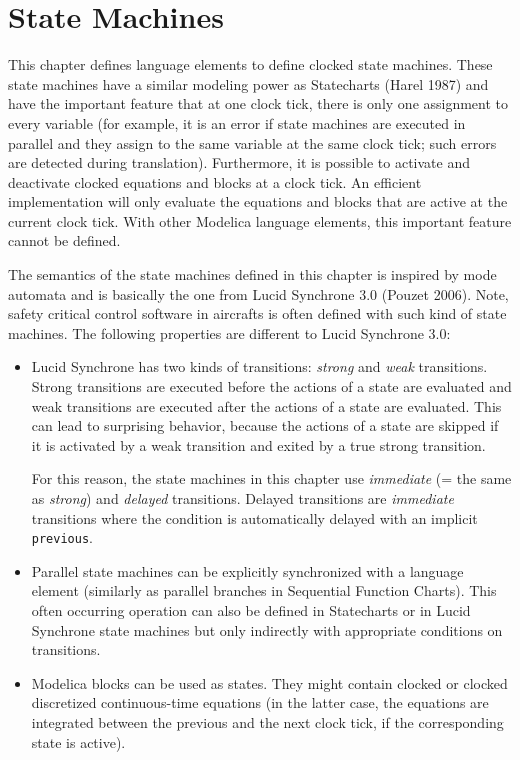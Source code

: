 \chapter{State Machines}\label{state-machines}

This chapter defines language elements to define clocked state
machines. These state machines have a similar modeling power as
Statecharts (Harel 1987) and have the important feature that at one
clock tick, there is only one assignment to every variable (for example,
it is an error if state machines are executed in parallel and they
assign to the same variable at the same clock tick; such errors are
detected during translation). Furthermore, it is possible to activate
and deactivate clocked equations and blocks at a clock tick. An
efficient implementation will only evaluate the equations and blocks
that are active at the current clock tick. With other Modelica language
elements, this important feature cannot be defined.

The semantics of the state machines defined in this chapter is
inspired by mode automata and is basically the one from Lucid Synchrone
3.0 (Pouzet 2006). Note, safety critical control software in aircrafts
is often defined with such kind of state machines. The following
properties are different to Lucid Synchrone 3.0:
\begin{itemize}
\item
  Lucid Synchrone has two kinds of transitions: \emph{strong} and
  \emph{weak} transitions. Strong transitions are executed before the
  actions of a state are evaluated and weak transitions are executed
  after the actions of a state are evaluated. This can lead to
  surprising behavior, because the actions of a state are skipped if it
  is activated by a weak transition and exited by a true strong
  transition.

  For this reason, the state machines in this chapter use \emph{immediate}
  (= the same as \emph{strong}) and \emph{delayed} transitions. Delayed
  transitions are \emph{immediate} transitions where the condition is
  automatically delayed with an implicit \lstinline!previous!.
\item
  Parallel state machines can be explicitly synchronized with a
  language element (similarly as parallel branches in Sequential
  Function Charts). This often occurring operation can also be defined
  in Statecharts or in Lucid Synchrone state machines but only
  indirectly with appropriate conditions on transitions.
\item
  Modelica blocks can be used as states. They might contain
  clocked or clocked discretized continuous-time equations (in the
  latter case, the equations are integrated between the previous and the
  next clock tick, if the corresponding state is active).
\end{itemize}

